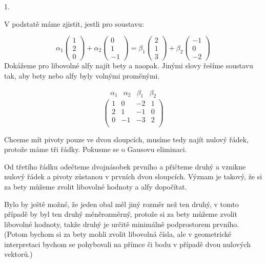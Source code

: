 \documentclass[10pt,a4paper]{article}
\begin{document}
1.

V podstatě máme zjistit, jestli pro soustavu:

\begin{equation*}
\alpha_1 \begin{pmatrix}
1 \\ 2 \\ 0
\end{pmatrix} 
+
\alpha_2 \begin{pmatrix}
0 \\ 1 \\ -1
\end{pmatrix}
=
\beta_1 \begin{pmatrix}
2 \\ 1 \\ 3
\end{pmatrix}
+
\beta_2 \begin{pmatrix}
-1 \\ 0 \\ -2
\end{pmatrix}
\end{equation*}
Dokážeme pro libovolné alfy najít bety a naopak. Jinými slovy řešíme soustavu tak, aby bety nebo alfy byly volnými proměnými.

\begin{equation*}
\begin{matrix}
\alpha_1 & \alpha_2 & \beta_1 & \beta_2
\end{matrix} 
\end{equation*}
\begin{equation*}
\begin{pmatrix}
1 & 0 & -2 & 1 \\
2 & 1 & -1 & 0 \\
0 &-1 & -3 & 2 \\
\end{pmatrix}
\end{equation*}

Chceme mít pivoty pouze ve dvou sloupcích, musíme tedy najít nulový řádek, protože máme tři řádky. Pokusme se o Gausovu eliminaci.

Od třetího řádku odečteme dvojnásobek prvního a přičteme druhý a vznikne nulový řádek a pivoty zůstanou v prvních dvou sloupcích. Význam je takový, že si za bety můžeme zvolit libovolné hodnoty a alfy dopočítat.

Bylo by ještě možné, že jeden obal měl jiný rozměr než ten druhý, v tomto případě by byl ten druhý méněrozměrný, protože si za bety můžeme zvolit libovolné hodnoty, takže druhý je určitě minimálně podprostorem prvního. (Potom bychom si za bety mohli zvolit libovolná čísla, ale v geometrické interpretaci bychom se pohybovali na přímce či bodu v případě dvou nulových vektorů.)
\end{document}
